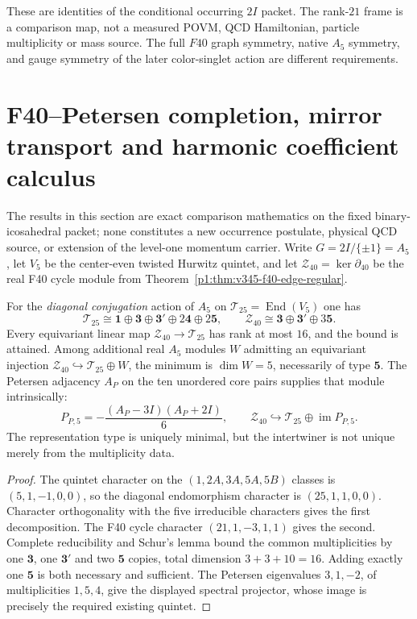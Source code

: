 \documentclass[11pt]{article}
\begin{document}
\begin{remark}
\label{p1:rem:v345-f40-source-firewall}
These are identities of the conditional occurring $2I$ packet.
The rank-$21$ frame is a comparison map, not a measured POVM,
QCD Hamiltonian, particle multiplicity or mass source.  The full
$F40$ graph symmetry, native $A_5$ symmetry, and gauge symmetry
of the later color-singlet action are different requirements.
\end{remark}

\clearpage
\section{F40--Petersen completion, mirror transport and harmonic coefficient calculus}
\label{p1:sec:v349-f40-harmonic-completion}
The results in this section are exact comparison mathematics on the fixed
binary-icosahedral packet; none constitutes a new occurrence postulate,
physical QCD source, or extension of the level-one momentum carrier.
Write $G=2I/\{\pm1\}=A_5$, let $V_5$ be the center-even twisted
Hurwitz quintet, and let $\mathcal Z_{40}=\ker\partial_{40}$ be the
real F40 cycle module from Theorem~\ref{p1:thm:v345-f40-edge-regular}.

\begin{theorem}
\label{p1:thm:v349-f40-minimal-quintet}
For the \emph{diagonal conjugation} action of $A_5$ on
$\mathcal T_{25}=\operatorname{End}(V_5)$ one has
\[
 \mathcal T_{25}\cong\mathbf1\oplus\mathbf3\oplus\mathbf3'
 \oplus2\mathbf4\oplus2\mathbf5,\qquad
 \mathcal Z_{40}\cong\mathbf3\oplus\mathbf3'\oplus3\mathbf5.
\]
Every equivariant linear map $\mathcal Z_{40}\to\mathcal T_{25}$
has rank at most $16$, and the bound is attained.  Among additional
real $A_5$ modules $W$ admitting an equivariant injection
$\mathcal Z_{40}\hookrightarrow\mathcal T_{25}\oplus W$,
the minimum is $\dim W=5$, necessarily of type $\mathbf5$.
The Petersen adjacency $A_P$ on the ten unordered core pairs supplies
that module intrinsically:
\[
 P_{P,5}=-\frac{(A_P-3I)(A_P+2I)}6,\qquad
 \mathcal Z_{40}\hookrightarrow\mathcal T_{25}\oplus\operatorname{im}P_{P,5}.
\]
The representation type is uniquely minimal, but the intertwiner is
not unique merely from the multiplicity data.
\end{theorem}
\begin{proof}
The quintet character on the $(1,2A,3A,5A,5B)$ classes is
$(5,1,-1,0,0)$, so the diagonal endomorphism character is
$(25,1,1,0,0)$.  Character orthogonality with the five irreducible
characters gives the first decomposition.  The F40 cycle character
$(21,1,-3,1,1)$ gives the second.  Complete reducibility and
Schur's lemma bound the common multiplicities by one $\mathbf3$,
one $\mathbf3'$ and two $\mathbf5$ copies, total dimension
$3+3+10=16$.  Adding exactly one $\mathbf5$ is both necessary
and sufficient.  The Petersen eigenvalues $3,1,-2$, of multiplicities
$1,5,4$, give the displayed spectral projector, whose image is
precisely the required existing quintet.
\end{proof}
\end{document}
